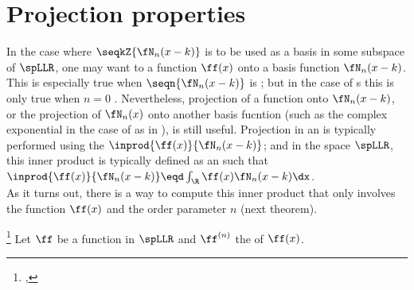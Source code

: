 \section{Projection properties}
In the case where $\seqkZ{\fN_n(x-k)}$ is to be used as a basis in some subspace of $\spLLR$,
one may want to  a function $\ff(x)$ onto a basis function $\fN_n(x-k)$.
This is especially true when $\seqn{\fN_n(x-k)}$ is ;
but in the case of s this is only true when $n=0$ .
Nevertheless, projection of a function onto $\fN_n(x-k)$, or the projection
of $\fN_n(x)$ onto another basis fucntion
(such as the complex exponential in the case of  as in ),
is still useful.
Projection in an  is typically performed using the 
$\inprod{\ff(x)}{\fN_n(x-k)}$; and in the space $\spLLR$,
this inner product is typically defined as an  such that
  \\\indentx$\inprod{\ff(x)}{\fN_n(x-k)}\eqd\int_\R\ff(x)\fN_n(x-k)\dx$.\\
As it turns out, there is a way to compute this inner product that only involves the function $\ff(x)$
and the order parameter $n$ (next theorem).
\begin{theorem}
\footnote{
  ,
  }
\label{thm:int_fNn}
Let $\ff$ be a  function in $\spLLR$
and $\ff^{(n)}$ the  of $\ff(x)$.
\end{theorem}
